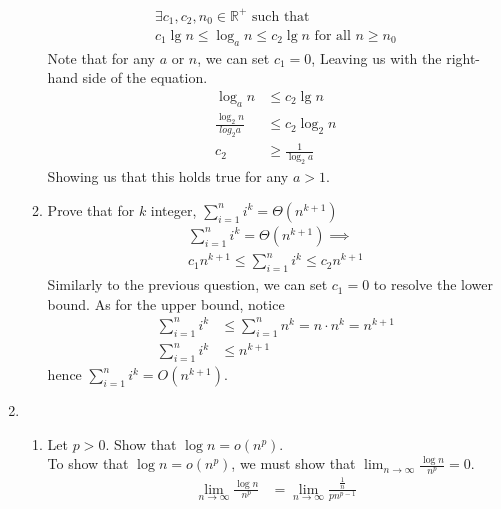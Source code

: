 \documentclass{article}
\begin{document}
\begin{enumerate}
\begin{enumerate}[label=\arabic*.]
\begin{align*}
                        \exists c_1, c_2, n_0 \in \mathbb{R}^+ \text{ such that } \\
                        c_1\lg n \leq \log_an \leq c_2\lg n \text{ for all } n \geq n_0
                    \end{align*}
                    Note that for any \(a\) or \(n\), we can set \(c_1 = 0\), Leaving us with the right-hand side of the equation.
                    \begin{align*}
                        \log_an                & \leq c_2 \lg n         \\
                        \frac{\log_2n}{log_2a} & \leq c_2 \log_2n       \\
                        c_2                    & \geq \frac{1}{\log_2a}
                    \end{align*}
                    Showing us that this holds true for any \(a > 1\).
                    \pagebreak
              \item Prove that for \(k\) integer, \(\sum_{i=1}^{n}{i^k} = \Theta(n^{k+1})\) \\
                    \begin{align*}
                        \sum_{i=1}^{n}{i^k} = \Theta(n^{k+1}) \implies \\
                        c_1n^{k+1} \leq \sum_{i=1}^{n}{i^k} \leq c_2n^{k+1}
                    \end{align*}
                    Similarly to the previous question, we can set \(c_1 = 0\) to resolve the lower bound.
                    As for the upper bound, notice
                    \begin{align*}
                        \sum_{i=1}^{n}{i^k} & \leq \sum_{i=1}^{n}{n^k} = n \cdot n^k = n^{k+1} \\
                        \sum_{i=1}^{n}{i^k} & \leq n^{k+1}
                    \end{align*}
                    hence \(\sum_{i=1}^{n}{i^k} = O(n^{k+1})\).
          \end{enumerate}
    \item  \begin{enumerate}[label=\arabic*.]
              \item Let \(p > 0\). Show that \(\log n = o(n^p)\). \\
                    To show that \(\log n = o(n^p)\), we must show that \(\lim_{n \to \infty}{\frac{\log n}{n^p}} = 0\).
                    \begin{align*}
                        \lim_{n \to \infty}{\frac{\log n}{n^p}} & = \lim_{n \to \infty}{\frac{\frac{1}{n}}{pn^{p-1}}} \\

\end{align*}
\end{enumerate}
\end{enumerate}
\end{document}
